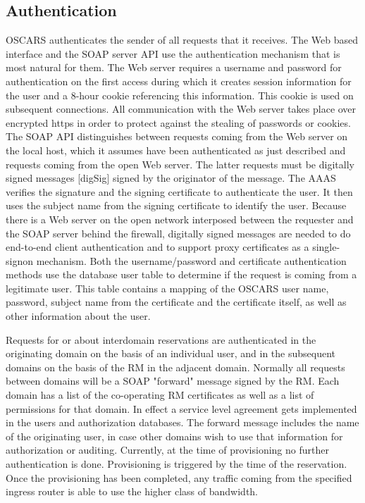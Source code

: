 \documentclass[conference]{IEEEtran}
\begin{document}
\subsection{Authentication}
OSCARS authenticates the sender of all requests that it receives.
The Web based interface and the SOAP server API use the
authentication mechanism that is most natural for them. The Web server
requires a username and password for authentication on the first
access during which it creates session information for the user and a
8-hour cookie referencing this information. This cookie is used on subsequent
connections. All communication with the Web server takes place over
encrypted https in order to protect against the stealing of passwords
or cookies. The SOAP API distinguishes between requests coming from
the Web server on the local host, which it assumes have been authenticated
as just described and requests coming from the open Web server. The 
latter requests  must be digitally signed messages [digSig] signed by the
originator of the message. The AAAS verifies the signature and the signing 
certificate to authenticate
the user. It then uses the subject name from the signing certificate
to identify the user. Because there is a Web server on the open network 
interposed between the
requester and the SOAP server behind the firewall, digitally signed messages 
are 
needed to do end-to-end client authentication and to support proxy certificates
as a single-signon mechanism. Both the username/password and certificate 
authentication methods use the database user table to
determine if the request is coming from a legitimate user. This table
contains a mapping of the OSCARS user name, password, subject name
from the certificate and the certificate itself, as well as other
information about the user.

Requests for or about interdomain
reservations are authenticated in the originating domain on the basis
of an individual user, and in the subsequent domains on the basis of
the RM in the adjacent domain. Normally all requests
between domains will be a SOAP "forward"  message
signed by the RM. Each domain has a list of the
co-operating RM certificates as well as a list of
permissions for that domain. In effect a service level agreement gets
implemented in the users and authorization databases. The forward
message includes the name of the originating user, in case other
domains wish to use that information for authorization or auditing.
Currently, at the time of provisioning no further authentication is
done. Provisioning is triggered by the time of the reservation. Once
the provisioning has been completed, any traffic coming from the
specified ingress router is able to use the higher class of bandwidth.
\end{document}
